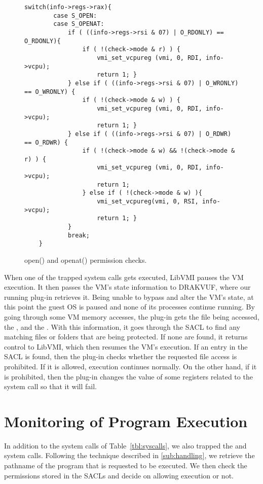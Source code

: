 \begin{figure}[ht!]
\selectfont
\begin{lstlisting}[style=CStyle]
	switch(info->regs->rax){
		case S_OPEN:
		case S_OPENAT:
			if ( ((info->regs->rsi & 07) | O_RDONLY) == O_RDONLY){
				if ( !(check->mode & r) ) {
					vmi_set_vcpureg (vmi, 0, RDI, info->vcpu);
					return 1; }
			} else if ( ((info->regs->rsi & 07) | O_WRONLY) == O_WRONLY) {
				if ( !(check->mode & w) ) {
					vmi_set_vcpureg (vmi, 0, RDI, info->vcpu);
					return 1; }
			} else if ( ((info->regs->rsi & 07) | O_RDWR) == O_RDWR) {
				if ( !(check->mode & w) && !(check->mode & r) ) {
					vmi_set_vcpureg (vmi, 0, RDI, info->vcpu);
					return 1;
				} else if ( !(check->mode & w) ){
					vmi_set_vcpureg(vmi, 0, RSI, info->vcpu);
					return 1; }
			}
			break;
	}
\end{lstlisting}
	\caption{open() and openat() permission checks.}
	\label{fig:open}
\end{figure}

\par When one of the trapped system calls gets executed, LibVMI pauses the \ac{VM} execution. It then passes the \ac{VM}'s state information to DRAKVUF, where our running plug-in retrieves it. Being unable to bypass and alter the \ac{VM}'s state, at this point the guest \ac{OS} is paused and none of its processes continue running. By going through some \ac{VM} memory accesses, the plug-in gets the file being accessed, the , and the . With this information, it goes through the \ac{SACL} to find any matching files or folders that are being protected. If none are found, it returns control to LibVMI, which then resumes the \ac{VM}'s execution. If an entry in the \ac{SACL} is found, then the plug-in checks whether the requested file access is prohibited. If it is allowed, execution continues normally. On the other hand, if it is prohibited,  then the plug-in changes the value of some registers related to the system call so that it will fail.


\section{Monitoring of Program Execution}

\par In addition to the system calls of Table~\ref{tbl:syscalls}, we also trapped the  and  system calls. Following the technique described in \ref{sub:handling}, we retrieve the pathname of the program that is requested to be executed. We then check the permissions stored in the \acp{SACL} and decide on allowing execution or not.

